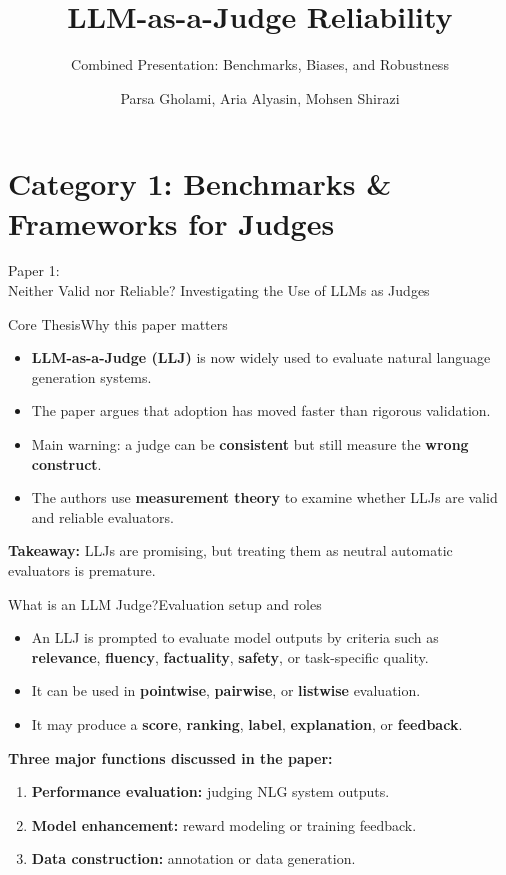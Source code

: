 \documentclass[10pt]{beamer}
\title{LLM-as-a-Judge Reliability}
\subtitle{Combined Presentation: Benchmarks, Biases, and Robustness}
\date{}
\author{Parsa Gholami, Aria Alyasin, Mohsen Shirazi}
\institute{Sharif University of Technology}
\begin{document}
	
	\begin{frame}[plain,shrink=10]
		\titlepage
	\end{frame}
	
	
	\section{Category 1: Benchmarks \& Frameworks for Judges}
	\begin{frame}[standout]
		\hypertarget{paper1}{}
		\Large Paper 1:\\Neither Valid nor Reliable? Investigating the Use of LLMs as Judges
	\end{frame}
	

	\begin{frame}{Core Thesis}{Why this paper matters}
		\begin{itemize}
			\item \textbf{LLM-as-a-Judge (LLJ)} is now widely used to evaluate natural language generation systems.
			\item The paper argues that adoption has moved faster than rigorous validation.
			\item Main warning: a judge can be \textbf{consistent} but still measure the \textbf{wrong construct}.
			\item The authors use \textbf{measurement theory} to examine whether LLJs are valid and reliable evaluators.
		\end{itemize}
		\vspace{0.25cm}
		\textbf{Takeaway:} LLJs are promising, but treating them as neutral automatic evaluators is premature.
	\end{frame}
	
	\begin{frame}{What is an LLM Judge?}{Evaluation setup and roles}
		\begin{itemize}
			\item An LLJ is prompted to evaluate model outputs by criteria such as \textbf{relevance}, \textbf{fluency}, \textbf{factuality}, \textbf{safety}, or task-specific quality.
			\item It can be used in \textbf{pointwise}, \textbf{pairwise}, or \textbf{listwise} evaluation.
			\item It may produce a \textbf{score}, \textbf{ranking}, \textbf{label}, \textbf{explanation}, or \textbf{feedback}.
		\end{itemize}
		
		\vspace{0.2cm}
		\textbf{Three major functions discussed in the paper:}
		\begin{enumerate}
			\item \textbf{Performance evaluation:} judging NLG system outputs.
			\item \textbf{Model enhancement:} reward modeling or training feedback.
			\item \textbf{Data construction:} annotation or data generation.
		\end{enumerate}
	\end{frame}
	
\end{document}
